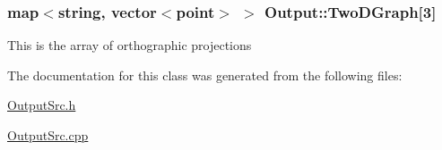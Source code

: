 \subsubsection[{\texorpdfstring{Two\+D\+Graph}{TwoDGraph}}]{\setlength{\rightskip}{0pt plus 5cm}map$<$string, vector$<${\bf point}$>$ $>$ Output\+::\+Two\+D\+Graph\mbox{[}3\mbox{]}}\hypertarget{classOutput_a24397893b0741447fdc351e5f66c2bfc}{}\label{classOutput_a24397893b0741447fdc351e5f66c2bfc}
This is the array of orthographic projections 

The documentation for this class was generated from the following files\+:\begin{DoxyCompactItemize}
\item 
\hyperlink{OutputSrc_8h}{Output\+Src.\+h}\item 
\hyperlink{OutputSrc_8cpp}{Output\+Src.\+cpp}\end{DoxyCompactItemize}
